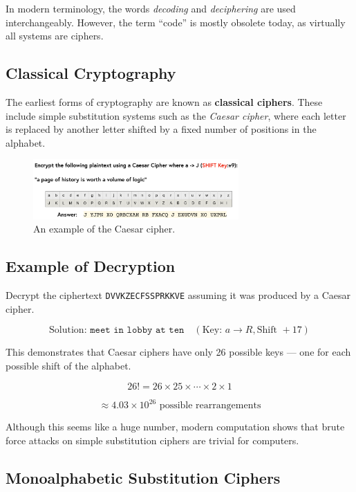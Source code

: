 In modern terminology, the words \emph{decoding} and \emph{deciphering} are used interchangeably. However, the term “code” is mostly obsolete today, as virtually all systems are ciphers.

\subsection{Classical Cryptography}

The earliest forms of cryptography are known as \textbf{classical ciphers}. These include simple substitution systems such as the \emph{Caesar cipher}, where each letter is replaced by another letter shifted by a fixed number of positions in the alphabet.  

\begin{figure}[h!]
\centering
\includegraphics[width=0.7\textwidth]{../Pictures/encrypt example.png}
\caption{An example of the Caesar cipher.}
\label{fig:caesar_cipher}
\end{figure}


\subsection{Example of Decryption}

Decrypt the ciphertext \texttt{DVVKZECFSSPRKKVE} assuming it was produced by a Caesar cipher.

\[
\text{Solution: } \texttt{meet in lobby at ten} \quad (\text{Key: } a \rightarrow R, \text{Shift } +17)
\]

This demonstrates that Caesar ciphers have only 26 possible keys — one for each possible shift of the alphabet.

\[
26! = 26 \times 25 \times \cdots \times 2 \times 1
\]

\[
\approx 4.03 \times 10^{26} \text{ possible rearrangements}
\]

Although this seems like a huge number, modern computation shows that brute force attacks on simple substitution ciphers are trivial for computers.

\subsection{Monoalphabetic Substitution Ciphers}

